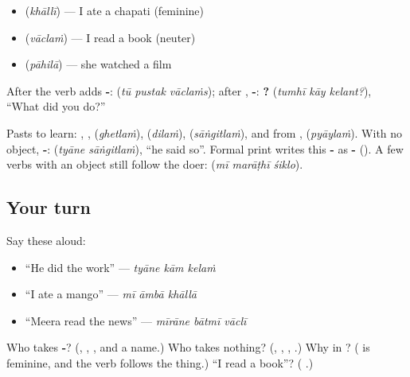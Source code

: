 \begin{itemize}
\raggedright
  \item \textbf{ } \textbf{} (\emph{khāllī}) — I ate a chapati (feminine)
  \item \textbf{ } \textbf{} (\emph{vāclaṁ}) — I read a book (neuter)
  \item \textbf{ } \textbf{} (\emph{pāhilā}) — she watched a film
\end{itemize}

After \textbf{} the verb adds \textbf{-}: \textbf{  } (\emph{tū pustak vāclaṁs}); after \textbf{}, \textbf{-}: \textbf{  ?} (\emph{tumhī kāy kelant?}), \textquotedblleft{}What did you do?\textquotedblright{}

Pasts to learn: \textbf{}, \textbf{}, \textbf{} (\emph{ghetlaṁ}), \textbf{} (\emph{dilaṁ}), \textbf{} (\emph{sāṅgitlaṁ}), and from \textbf{}, \textbf{} (\emph{pyāylaṁ}). With no object, \textbf{-}: \textbf{ } (\emph{tyāne sāṅgitlaṁ}), \textquotedblleft{}he said so\textquotedblright{}. Formal print writes this \textbf{-} as \textbf{-} (\textbf{}). A few verbs with an object still follow the doer: \textbf{  } (\emph{mī marāṭhī śiklo}).

\subsection*{Your turn}
Say these aloud:

\begin{itemize}
\raggedright
  \item \textquotedblleft{}He did the work\textquotedblright{} — \emph{tyāne kām kelaṁ}
  \item \textquotedblleft{}I ate a mango\textquotedblright{} — \emph{mī āmbā khāllā}
  \item \textquotedblleft{}Meera read the news\textquotedblright{} — \emph{mīrāne bātmī vāclī}
\end{itemize}

\begin{tcolorbox}[breakable,colback=teal!4,colframe=teal!35!black,title={Before you move on}]
Who takes \textbf{-}? (\textbf{}, \textbf{}, \textbf{}, and a name.) Who takes nothing? (\textbf{}, \textbf{}, \textbf{}, \textbf{}.) Why \textbf{} in \textbf{  }? (\textbf{} is feminine, and the verb follows the thing.) \textquotedblleft{}I read a book\textquotedblright{}? (\textbf{  }.)
\end{tcolorbox}

